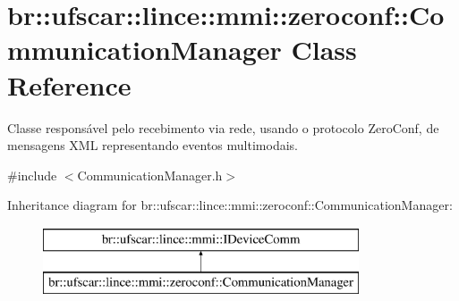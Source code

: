 \hypertarget{classbr_1_1ufscar_1_1lince_1_1mmi_1_1zeroconf_1_1CommunicationManager}{
\section{br::ufscar::lince::mmi::zeroconf::CommunicationManager Class Reference}
\label{classbr_1_1ufscar_1_1lince_1_1mmi_1_1zeroconf_1_1CommunicationManager}
}


Classe responsável pelo recebimento via rede, usando o protocolo ZeroConf, de mensagens XML representando eventos multimodais.  




{\ttfamily \#include $<$CommunicationManager.h$>$}

Inheritance diagram for br::ufscar::lince::mmi::zeroconf::CommunicationManager:\begin{figure}[H]
\begin{center}
\leavevmode
\includegraphics[height=2cm]{classbr_1_1ufscar_1_1lince_1_1mmi_1_1zeroconf_1_1CommunicationManager}
\end{center}
\end{figure}
